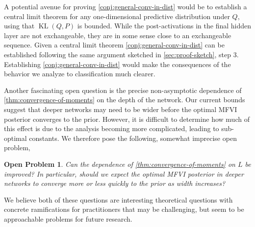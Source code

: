 \documentclass[twoside]{article}
\renewcommand{\P}{\mathbb{P}}
\newcommand{\Q}{\mathbb{Q}}
\renewcommand{\Q}{\ensuremath{Q}}
\renewcommand{\P}{\ensuremath{P}}
\newcommand{\KL}{\operatorname{KL}}
\theoremstyle{theoremstyle}
\newtheorem{openproblem}[theorem]{Open Problem}
\begin{document}
A potential avenue for proving \cref{conj:general-conv-in-dist} would be to establish a central limit theorem for any one-dimensional predictive distribution under $\Q$, using that $\KL(\Q,\P)$ is bounded. While the post-activations in the final hidden layer are not exchangeable, they are in some sense close to an exchangeable sequence. Given a central limit theorem \cref{conj:general-conv-in-dist} can be established following the same argument sketched in \cref{sec:proof-sketch}, step 3. Establishing \cref{conj:general-conv-in-dist} would make the consequences of the behavior we analyze to classification much clearer.


Another fascinating open question is the precise non-asymptotic dependence of \cref{thm:convergence-of-moments} on the depth of the network. Our current bounds suggest that deeper networks may need to be wider before the optimal MFVI posterior converges to the prior. However, it is difficult to determine how much of this effect is due to the analysis becoming more complicated, leading to sub-optimal constants. We therefore pose the following, somewhat imprecise open problem,
\begin{openproblem}
Can the dependence of \cref{thm:convergence-of-moments} on $L$ be improved? In particular, should we expect the optimal MFVI posterior in deeper networks to converge more or less quickly to the prior as width increases?
\end{openproblem}

We believe both of these questions are interesting theoretical questions with concrete ramifications for practitioners that may be challenging, but seem to be approachable problems for future research.

\end{document}
